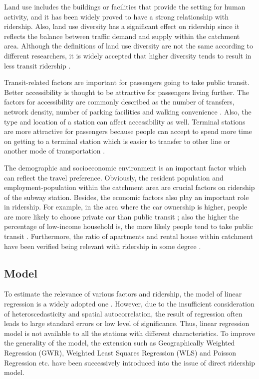 \documentclass[utf8]{article}
\begin{document}
%
Land use includes the buildings or facilities that provide the setting for human activity, and it has been widely proved to have a strong relationship with ridership. Also, land use diversity has a significant effect on ridership since it reflects the balance between traffic demand and supply within the catchment area. Although the definitions of land use diversity are not the same according to different researchers, it is widely accepted that higher diversity tends to result in less transit ridership \cite{Cardozo2012,Choi2012,Gutierrez2011,Jun2015,Sohn2010,Sung2014}.

%
Transit-related factors are important for passengers going to take public transit. Better accessibility is thought to be attractive for passengers living further. The factors for accessibility are commonly described as the number of transfers, network density, number of parking facilities and walking convenience \cite{Kuby2004,Sohn2010,Taylor2009,Zhao2014,Chu2004}. Also, the type and location of a station can affect accessibility as well. Terminal stations are more attractive for passengers because people can accept to spend more time on getting to a terminal station which is easier to transfer to other line or another mode of transportation \cite{OSullivan1996}.

%
The demographic and socioeconomic environment is an important factor which can reflect the travel preference. Obviously, the resident population and employment-population within the catchment area are crucial factors on ridership of the subway station. Besides, the economic factors also play an important role in ridership. For example, in the area where the car ownership is higher, people are more likely to choose private car than public transit \cite{Chiou2015,Zhao2005}; also the higher the percentage of low-income household is, the more likely people tend to take public transit \cite{Thompson2012}. Furthermore, the ratio of apartments and rental house within catchment have been verified being relevant with ridership in some degree \cite{Jun2015}.

%
\subsection{Model}
\indent

To estimate the relevance of various factors and ridership, the model of linear regression is a widely adopted one \cite{Cervero1997,Chakraborty2013}. However, due to the insufficient consideration of heteroscedasticity and spatial autocorrelation, the result of regression often leads to large standard errors or low level of significance. Thus, linear regression model is not available to all the stations with different characteristics. To improve the generality of the model, the extension such as Geographically Weighted Regression (GWR), Weighted Least Squares Regression (WLS) and Poisson Regression etc. have been successively introduced into the issue of direct ridership model.
\end{document}
